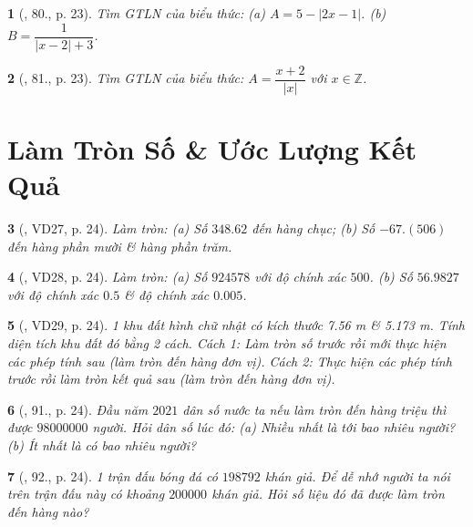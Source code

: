 \documentclass{article}
\newtheorem{baitoan}{}
\begin{document}
\begin{baitoan}[\cite{Binh_Toan_7_tap_1}, 80., p. 23]
	Tìm {\rm GTLN} của biểu thức: (a) $A = 5 - |2x - 1|$. (b) $B = \dfrac{1}{|x - 2| + 3}$.	
\end{baitoan}

\begin{baitoan}[\cite{Binh_Toan_7_tap_1}, 81., p. 23]
	Tìm {\rm GTLN} của biểu thức: $A = \dfrac{x + 2}{|x|}$ với $x\in\mathbb{Z}$.
\end{baitoan}


\section{Làm Tròn Số \& Ước Lượng Kết Quả}

\begin{baitoan}[\cite{Tuyen_Toan_7}, VD27, p. 24]
	Làm tròn: (a) Số $348.62$ đến hàng chục;
	(b) Số $-67.(506)$ đến hàng phần mười \& hàng phần trăm.
\end{baitoan}

\begin{baitoan}[\cite{Tuyen_Toan_7}, VD28, p. 24]
	Làm tròn: (a) Số $924578$ với độ chính xác $500$. (b) Số $56.9827$ với độ chính xác $0.5$ \& độ chính xác $0.005$.
\end{baitoan}

\begin{baitoan}[\cite{Tuyen_Toan_7}, VD29, p. 24]
	1 khu đất hình chữ nhật có kích thước {\rm7.56 m} \& {\rm5.173 m}. Tính diện tích khu đất đó bằng 2 cách. Cách 1: Làm tròn số trước rồi mới thực hiện các phép tính sau (làm tròn đến hàng đơn vị). Cách 2: Thực hiện các phép tính trước rồi làm tròn kết quả sau (làm tròn đến hàng đơn vị).
\end{baitoan}

\begin{baitoan}[\cite{Tuyen_Toan_7}, 91., p. 24]
	Đầu năm $2021$ dân số nước ta nếu làm tròn đến hàng triệu thì được $98000000$ người. Hỏi dân số lúc đó: (a) Nhiều nhất là tới bao nhiêu người? (b) Ít nhất là có bao nhiêu người?
\end{baitoan}

\begin{baitoan}[\cite{Tuyen_Toan_7}, 92., p. 24]
	1 trận đấu bóng đá có $198 792$ khán giả. Để dễ nhớ người ta nói trên trận đấu này có khoảng $200000$ khán giả. Hỏi số liệu đó đã được làm tròn đến hàng nào?
\end{baitoan}
\end{document}
